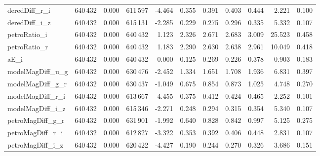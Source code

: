 \documentclass[xcolor={table}]{beamer}
\begin{document}
\begin{frame} [plain]
\begin{scriptsize}
{\begin{tabular}{  l  c  r  c r  r r r r r r}
deredDiff\_r\_i	&	640\,432	&	0.000	&	611\,597	&	-4.464	&	0.355	&	0.391	&	0.403	&	0.444	&	2.221	&	0.100	\\
deredDiff\_i\_z	&	640\,432	&	0.000	&	615\,131	&	-2.285	&	0.229	&	0.275	&	0.296	&	0.335	&	5.332	&	0.107	\\
petroRatio\_i	&	640\,432	&	0.000	&	640\,432	&	1.123	&	2.326	&	2.671	&	2.683	&	3.009	&	25.523	&	0.458	\\
petroRatio\_r	&	640\,432	&	0.000	&	640\,432	&	1.183	&	2.290	&	2.630	&	2.638	&	2.961	&	10.049	&	0.418	\\
aE\_i	&	640\,432	&	0.000	&	640\,432	&	0.000	&	0.125	&	0.269	&	0.226	&	0.378	&	0.903	&	0.183	\\
modelMagDiff\_u\_g	&	640\,432	&	0.000	&	630\,476	&	-2.452	&	1.334	&	1.651	&	1.708	&	1.936	&	6.831	&	0.397	\\
modelMagDiff\_g\_r	&	640\,432	&	0.000	&	630\,437	&	-1.049	&	0.675	&	0.854	&	0.873	&	1.025	&	4.748	&	0.270	\\
modelMagDiff\_r\_i	&	640\,432	&	0.000	&	613\,667	&	-4.455	&	0.375	&	0.412	&	0.424	&	0.465	&	2.252	&	0.101	\\
modelMagDiff\_i\_z	&	640\,432	&	0.000	&	615\,346	&	-2.271	&	0.248	&	0.294	&	0.315	&	0.354	&	5.340	&	0.107	\\
petroMagDiff\_g\_r	&	640\,432	&	0.000	&	631\,901	&	-1.992	&	0.640	&	0.828	&	0.842	&	0.997	&	5.125	&	0.275	\\
petroMagDiff\_r\_i	&	640\,432	&	0.000	&	612\,827	&	-3.322	&	0.353	&	0.392	&	0.406	&	0.448	&	2.831	&	0.107	\\
petroMagDiff\_i\_z	&	640\,432	&	0.000	&	620\,422	&	-4.427	&	0.190	&	0.244	&	0.270	&	0.326	&	3.686	&	0.151	\\
\hline
\end{tabular}}
\end{scriptsize}
\end{frame} 
\end{document}
